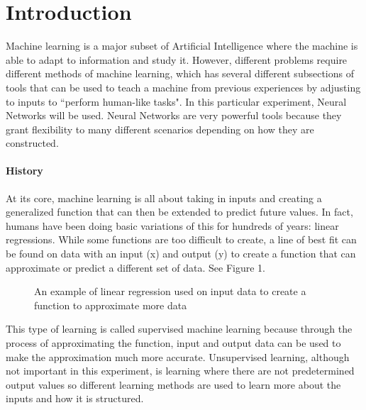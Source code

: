 \documentclass[12pt]{article}
\begin{document}
\maketitle

\section{Introduction}
\quad Machine learning is a major subset of Artificial Intelligence where the machine is able to adapt to information and study it. However, different problems require different methods of machine learning, which has several different subsections of tools that can be used to teach a machine from previous experiences by adjusting to inputs to ``perform human-like tasks". In this particular experiment, Neural Networks will be used. Neural Networks are very powerful tools because they grant flexibility to many different scenarios depending on how they are constructed. 


\paragraph{History}
At its core, machine learning is all about taking in inputs and creating a generalized function that can then be extended to predict future values. In fact, humans have been doing basic variations of this for hundreds of years: linear regressions. While some functions are too difficult to create, a line of best fit can be found on data with an input (x) and output (y) to create a function that can approximate or predict a different set of data. See Figure 1. \cite{kurenkov}

\begin{figure}[H]
    \centering
    \def\svgwidth{\columnwidth}
    
    \caption{An example of linear regression used on input data to create a function to approximate more data}
\end{figure}

This type of learning is called supervised machine learning because through the process of approximating the function, input and output data can be used to make the approximation much more accurate. Unsupervised learning, although not important in this experiment, is learning where there are not predetermined output values so different learning methods are used to learn more about the inputs and how it is structured. \cite{brownlee_2016}\\%
\end{document}
